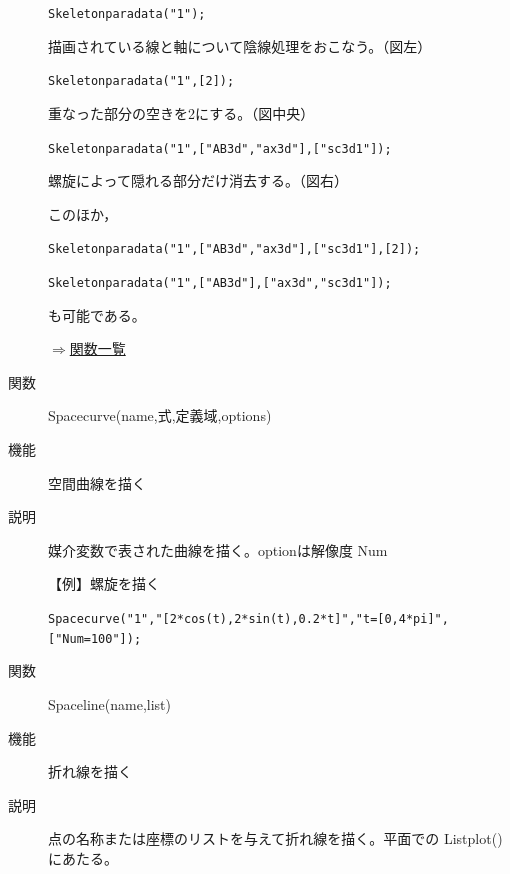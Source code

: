\documentclass[papersize,a4paper,12pt,uplatex]{jsarticle}
\begin{document}
\begin{description}
\hspace{10mm} \verb|Skeletonparadata("1");|

 描画されている線と軸について陰線処理をおこなう。（図左）

\hspace{10mm} \verb|Skeletonparadata("1",[2]);|

 重なった部分の空きを2にする。（図中央）
 
\hspace{10mm} \verb|Skeletonparadata("1",["AB3d","ax3d"],["sc3d1"]);|
  
螺旋によって隠れる部分だけ消去する。（図右）

\begin{center}     
  \end{center}

このほか，

\hspace{10mm} \verb|Skeletonparadata("1",["AB3d","ax3d"],["sc3d1"],[2]);|

\hspace{10mm} \verb|Skeletonparadata("1",["AB3d"],["ax3d","sc3d1"]);|

も可能である。

\begin{flushright} \hyperlink{functionlist}{$\Rightarrow$関数一覧}\end{flushright}
\vspace{\baselineskip}

\hypertarget{spacecurve}{}
\item[関数]  Spacecurve(name,式,定義域,options)
\item[機能]  空間曲線を描く
\item[説明]  媒介変数で表された曲線を描く。optionは解像度 Num

\vspace{\baselineskip}
【例】螺旋を描く

\verb|Spacecurve("1","[2*cos(t),2*sin(t),0.2*t]","t=[0,4*pi]",["Num=100"]);|
    
\vspace{\baselineskip}
 \begin{center}  \end{center}

\hypertarget{spaceline}{}
\item[関数]  Spaceline(name,list)
\item[機能]  折れ線を描く
\item[説明]  点の名称または座標のリストを与えて折れ線を描く。平面での Listplot() にあたる。



\end{description}
\end{document}
